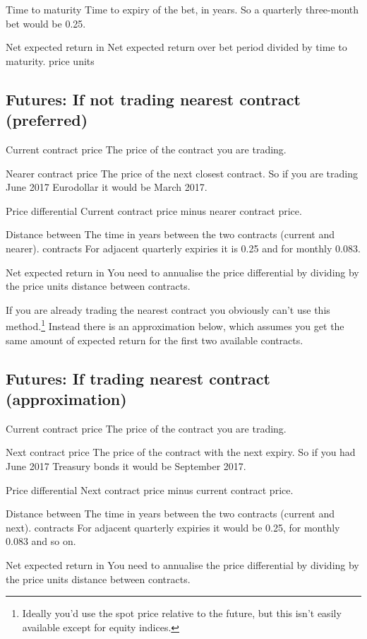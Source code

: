 Time to maturity Time to expiry of the bet, in years. So a quarterly three-month bet would be 0.25.

Net expected return in Net expected return over bet period divided by time to maturity. price units

\subsection*{Futures: If not trading nearest contract (preferred)}

Current contract price The price of the contract you are trading.

Nearer contract price The price of the next closest contract. So if you are trading June 2017 Eurodollar it would be March 2017.

Price differential Current contract price minus nearer contract price.

Distance between The time in years between the two contracts (current and nearer). contracts For adjacent quarterly expiries it is 0.25 and for monthly 0.083.

Net expected return in You need to annualise the price differential by dividing by the price units distance between contracts.

If you are already trading the nearest contract you obviously can't use this method.\footnote{Ideally you'd use the spot price relative to the future, but this isn't easily available except for equity indices.} Instead there is an approximation below, which assumes you get the same amount of expected return for the first two available contracts.

\subsection*{Futures: If trading nearest contract (approximation)}

Current contract price The price of the contract you are trading.

Next contract price The price of the contract with the next expiry. So if you had June 2017 Treasury bonds it would be September 2017.

Price differential Next contract price minus current contract price.

Distance between The time in years between the two contracts (current and next). contracts For adjacent quarterly expiries it would be 0.25, for monthly 0.083 and so on.

Net expected return in You need to annualise the price differential by dividing by the price units distance between contracts.

